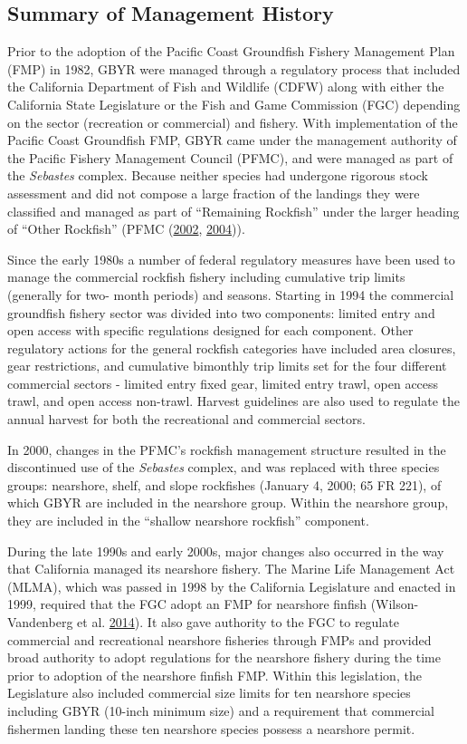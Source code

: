 \documentclass[12pt,]{article}
\begin{document}
\subsection{Summary of Management
History}\label{summary-of-management-history}

Prior to the adoption of the Pacific Coast Groundfish Fishery Management
Plan (FMP) in 1982, GBYR were managed through a regulatory process that
included the California Department of Fish and Wildlife (CDFW) along
with either the California State Legislature or the Fish and Game
Commission (FGC) depending on the sector (recreation or commercial) and
fishery. With implementation of the Pacific Coast Groundfish FMP, GBYR
came under the management authority of the Pacific Fishery Management
Council (PFMC), and were managed as part of the \emph{Sebastes} complex.
Because neither species had undergone rigorous stock assessment and did
not compose a large fraction of the landings they were classified and
managed as part of ``Remaining Rockfish'' under the larger heading of
``Other Rockfish'' (PFMC (\protect\hyperlink{ref-PFMC2002}{2002},
\protect\hyperlink{ref-PFMC2004}{2004})).

Since the early 1980s a number of federal regulatory measures have been
used to manage the commercial rockfish fishery including cumulative trip
limits (generally for two- month periods) and seasons. Starting in 1994
the commercial groundfish fishery sector was divided into two
components: limited entry and open access with specific regulations
designed for each component. Other regulatory actions for the general
rockfish categories have included area closures, gear restrictions, and
cumulative bimonthly trip limits set for the four different commercial
sectors - limited entry fixed gear, limited entry trawl, open access
trawl, and open access non-trawl. Harvest guidelines are also used to
regulate the annual harvest for both the recreational and commercial
sectors.

In 2000, changes in the PFMC's rockfish management structure resulted in
the discontinued use of the \emph{Sebastes} complex, and was replaced
with three species groups: nearshore, shelf, and slope rockfishes
(January 4, 2000; 65 FR 221), of which GBYR are included in the
nearshore group. Within the nearshore group, they are included in the
``shallow nearshore rockfish'' component.

During the late 1990s and early 2000s, major changes also occurred in
the way that California managed its nearshore fishery. The Marine Life
Management Act (MLMA), which was passed in 1998 by the California
Legislature and enacted in 1999, required that the FGC adopt an FMP for
nearshore finfish (Wilson-Vandenberg et al.
\protect\hyperlink{ref-Vandenberg2014}{2014}). It also gave authority to
the FGC to regulate commercial and recreational nearshore fisheries
through FMPs and provided broad authority to adopt regulations for the
nearshore fishery during the time prior to adoption of the nearshore
finfish FMP. Within this legislation, the Legislature also included
commercial size limits for ten nearshore species including GBYR (10-inch
minimum size) and a requirement that commercial fishermen landing these
ten nearshore species possess a nearshore permit.
\end{document}
